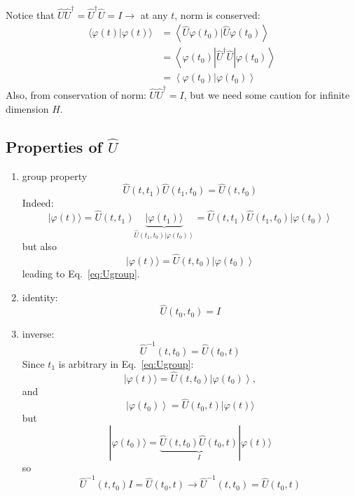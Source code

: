 \documentclass[12pt]{article}
\begin{document}
Notice that $\hat{U} \hat{U}^{\dagger} = \hat{U}^{\dagger}\hat{U} = I \to$ at any $t$, norm is conserved:
\begin{equation}
\begin{aligned}
\langle\varphi(t) | \varphi(t)\rangle 
&=\left\langle\hat{U} \varphi\left(t_{0}\right) | \hat{U} \varphi\left(t_{0}\right)\right\rangle \\ 
&=\left\langle\varphi\left(t_{0}\right)\left|\hat{U}^{\dagger} \hat{U}\right| \varphi\left(t_{0}\right)\right\rangle \\ 
&=\left\langle\varphi\left(t_{0}\right) | \varphi\left(t_{0}\right)\right\rangle 
\end{aligned}
\end{equation}
Also, from conservation of norm: $\hat{U} \hat{U}^{\dagger} = I$, but we need some caution for infinite dimension $H$.


\subsection{\texorpdfstring{Properties of $\hat{U}$}{Properties of U}}

\begin{enumerate}
\item group property
\begin{equation}
\hat{U}\left(t, t_{1}\right) \hat{U}\left(t_{1}, t_{0}\right)=\hat{U}\left(t, t_{0}\right)
\label{eq:Ugroup}
\end{equation}
Indeed:
\[
|\varphi(t)\rangle=
\hat{U}\left(t, t_{1}\right)\underbrace{|\varphi\left(t_{1}\right)\rangle}%
_{\hat{U}\left(t_{1}, t_{0}\right)\left|\varphi\left(t_{0}\right)\right\rangle}
=\hat{U}\left(t, t_{1}\right) \hat{U}\left(t_{1}, t_{0}\right)\left|\varphi\left(t_{0}\right)\right\rangle
\]
but also 
\[
|\varphi(t)\rangle = \hat{U}\left(t, t_{0}\right)\left|\varphi\left(t_{0}\right)\right\rangle
\]
leading to Eq.~\eqref{eq:Ugroup}.
%
\item identity: 
\begin{equation}
\hat{U}(t_0,t_0) = I
\end{equation}
%
\item inverse:
\begin{equation}
\hat{U}^{-1}\left(t, t_{0}\right)=\hat{U}\left(t_{0}, t\right)
\end{equation}
Since $t_1$ is arbitrary in Eq.~\eqref{eq:Ugroup}:
\[
|\varphi(t)\rangle=\hat{U}\left(t, t_{0}\right)\left|\varphi\left(t_{0}\right)\right\rangle,
\]
and
\[
\left|\varphi\left(t_{0}\right)\right\rangle=\hat{U}\left(t_{0}, t\right)|\varphi(t)\rangle
\]
but
\[
|\varphi(t_0)\rangle = \underbrace{\hat{U}\left(t, t_{0}\right) \hat{U}\left(t_{0}, t\right)}%
_{I}%
|\varphi(t)\rangle
\]
so
\[
\hat{U}^{-1}\left(t, t_{0}\right) I=\hat{U}\left(t_{0}, t\right) \rightarrow \hat{U}^{-1}\left(t, t_{0}\right)=\hat{U}\left(t_{0}, t\right)
\]
\end{enumerate}
\end{document}
